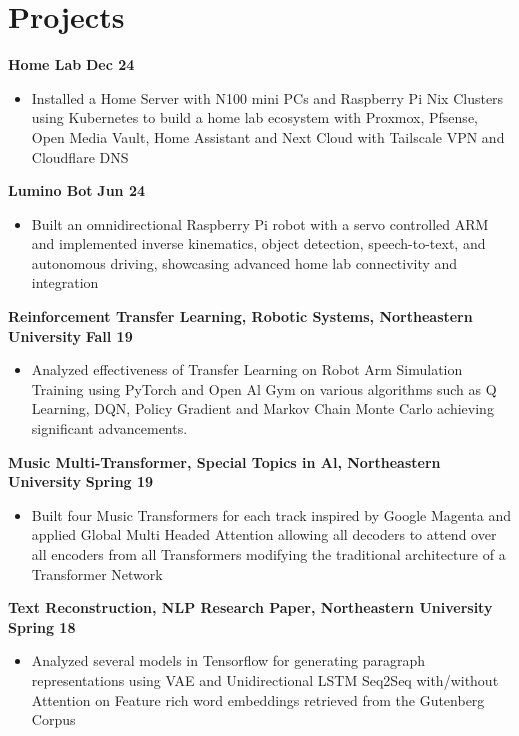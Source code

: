 \documentclass[10pt, letterpaper]{article}
\newcommand{\projectentry}[2]{
  \noindent\textbf{#1} \hfill \textbf{#2}
}
\begin{document}
\section{Projects}

\projectentry{Home Lab}{Dec 24}
\begin{itemize}
	\item Installed a Home Server with N100 mini PCs and Raspberry Pi Nix Clusters using Kubernetes to build a home lab ecosystem with Proxmox, Pfsense, Open Media Vault, Home Assistant and Next Cloud with Tailscale VPN and Cloudflare DNS
\end{itemize}

\projectentry{Lumino Bot}{Jun 24}
\begin{itemize}
	\item Built an omnidirectional Raspberry Pi robot with a servo controlled ARM and implemented inverse kinematics, object detection, speech-to-text, and autonomous driving, showcasing advanced home lab connectivity and integration
\end{itemize}

\projectentry{Reinforcement Transfer Learning, Robotic Systems, Northeastern University}{Fall 19}
\begin{itemize}
	\item Analyzed effectiveness of Transfer Learning on Robot Arm Simulation Training using PyTorch and Open Al Gym on various algorithms such as Q Learning, DQN, Policy Gradient and Markov Chain Monte Carlo achieving significant advancements.
\end{itemize}

\projectentry{Music Multi-Transformer, Special Topics in Al, Northeastern University}{Spring 19}
\begin{itemize}
	\item Built four Music Transformers for each track inspired by Google Magenta and applied Global Multi Headed Attention allowing all decoders to attend over all encoders from all Transformers modifying the traditional architecture of a Transformer Network
\end{itemize}

\projectentry{Text Reconstruction, NLP Research Paper, Northeastern University}{Spring 18}
\begin{itemize}
	\item Analyzed several models in Tensorflow for generating paragraph representations using VAE and Unidirectional LSTM Seq2Seq with/without Attention on Feature rich word embeddings retrieved from the Gutenberg Corpus
\end{itemize}
\end{document}
